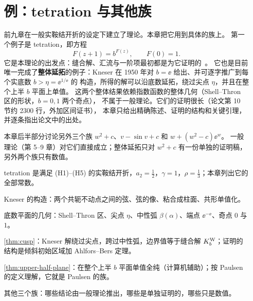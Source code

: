\providecommand{\STreg}{\mathcal{ST}}          %
\providecommand{\Uup}{\mathcal U^{+}}          %
\providecommand{\Eup}{\mathcal E^{+}}          %
\providecommand{\Ftr}{F^{\mathrm{tr}}}         %

\chapter{例：tetration 与其他族}\label{ch:examples}

前九章在一般实鞍结开折的设定下建立了理论。本章把它用到具体的族上。
第一个例子是 tetration，即方程
\begin{equation}\label{ch10:eq:tetration}
  F(z+1)=b^{F(z)},\qquad F(0)=1 .
\end{equation}
它是本理论的出发点：缝合解、汇流与一阶项最初都是为它证明的~\cite{KneserPaper}。
它也是目前唯一完成了\textbf{整体延拓}的例子：Kneser 在 1950 年对 $b=\ee$ 给出、并可逐字推广到每个实底数 $b>\eta=\ee^{1/\ee}$ 的
构造，所得的解可以沿底数延拓，绕过尖点 $\eta$，并且在整个上半 $b$ 平面上单值。
这两个整体结果依赖指数函数的整体几何（Shell--Thron 区的形状，$b=0,1$ 两个奇点），
不属于一般理论。它们的证明很长（论文第 10 节约 2300 行，外加区间证书），
本章只给出精确陈述、证明的结构和关键引理，并逐条指出论文中的出处。

本章后半部分讨论另外三个族 $w^2+c$、$v-\sin v+c$ 和 $w+(w^2-c)\ee^w$。
一般理论（第 5--9 章）对它们直接成立；整体延拓只对 $w^2+c$ 有一份单独的证明稿，
另外两个族只有数值。

\begin{goals}
\item tetration 是满足 (H1)--(H5) 的实鞍结开折，$a_2=\tfrac12$，$\gamma=1$，$\rho=\tfrac13$；本章列出它的全部常数。
\item Kneser 的构造：两个共轭不动点之间的弦、弦的像、粘合成柱面、共形单值化。
\item 底数平面的几何：Shell--Thron 区、尖点 $\eta$、中性弧 $\beta(\alpha)$、端点 $\ee^{-\ee}$、奇点 $0$ 与 $1$。
\item \cref{thm:cusp}：Kneser 解绕过尖点，跨过中性弧，边界值等于缝合解 $K^{\mathrm W}_b$；证明的结构是倾斜初始区域加 Ahlfors--Bers 定理。
\item \cref{thm:upper-half-plane}：在整个上半 $b$ 平面单值全纯（计算机辅助）；按 Paulsen 的定义理解，它就是 Paulsen 的族。
\item 其他三个族：哪些结论由一般理论推出，哪些是单独证明的，哪些只是数值。
\end{goals}

